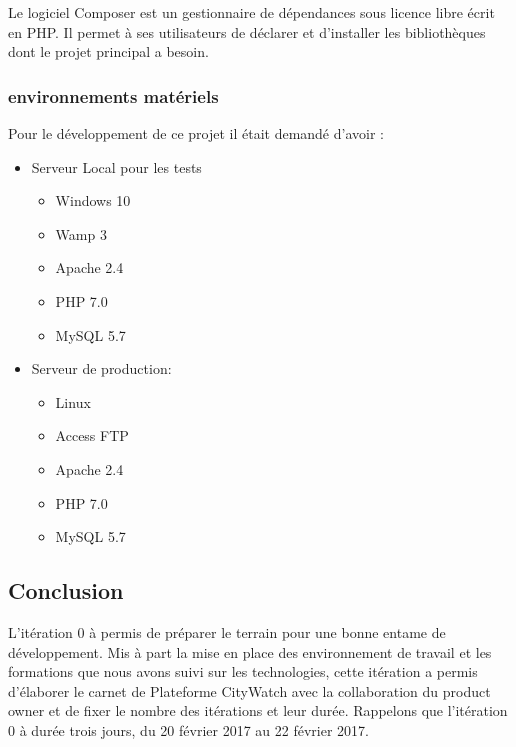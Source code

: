 Le logiciel Composer est un gestionnaire de dépendances sous licence libre écrit en PHP.
Il permet à ses utilisateurs de déclarer et d'installer les bibliothèques dont le projet principal a besoin. 

\subsubsection{environnements matériels}

Pour le développement de ce projet il était demandé d'avoir :
\begin{itemize}
 \item Serveur Local pour les tests
     \begin{itemize}
         \item Windows 10
         \item Wamp 3
         \item Apache 2.4
         \item PHP 7.0
         \item MySQL 5.7
     \end{itemize}
 \item Serveur de production:
     \begin{itemize}
      \item Linux
      \item Access FTP
      \item Apache 2.4
      \item PHP 7.0
      \item MySQL 5.7
     \end{itemize}
\end{itemize}

\subsection{Conclusion}

L'itération 0 à permis de préparer le terrain pour une bonne entame de
développement. Mis à part la mise en place des environnement de travail et les
formations que nous avons suivi sur les technologies, cette itération a permis d'élaborer
le carnet de Plateforme CityWatch avec la collaboration du product owner et de fixer le
nombre des itérations et leur durée. Rappelons que l'itération 0 à durée trois jours,
du 20 février 2017 au 22 février 2017.
